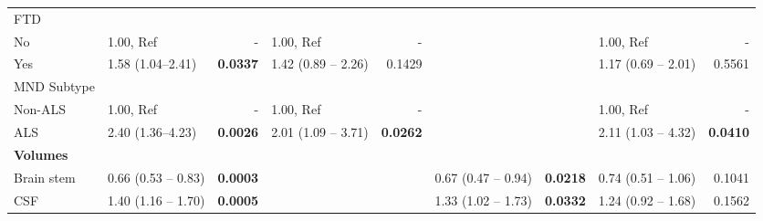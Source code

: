 \begin{sidewaystable}
{\begin{tabular}{|l|lr|lr|lr|lr|}
\hline
FTD &  &  &  &  & {\cellcolor[rgb]{0.753,0.753,0.753}} & {\cellcolor[rgb]{0.753,0.753,0.753}} &  &  \\
\hspace{5mm}No & 1.00, Ref & - & 1.00, Ref & - & {\cellcolor[rgb]{0.753,0.753,0.753}} & {\cellcolor[rgb]{0.753,0.753,0.753}} & 1.00, Ref & - \\
\hspace{5mm}Yes & 1.58 (1.04--2.41) & \textbf{0.0337} & \textcolor[rgb]{0.2,0.2,0.2}{1.42 (0.89 -- 2.26)} & \textcolor[rgb]{0.2,0.2,0.2}{0.1429} & {\cellcolor[rgb]{0.753,0.753,0.753}} & {\cellcolor[rgb]{0.753,0.753,0.753}} & \textcolor[rgb]{0.2,0.2,0.2}{1.17 (0.69 -- 2.01)} & \textcolor[rgb]{0.2,0.2,0.2}{0.5561} \\ 
\hline
MND Subtype &  &  &  &  & {\cellcolor[rgb]{0.753,0.753,0.753}} & {\cellcolor[rgb]{0.753,0.753,0.753}} &  &  \\
\hspace{5mm}Non-ALS & 1.00, Ref & - & 1.00, Ref & - & {\cellcolor[rgb]{0.753,0.753,0.753}} & {\cellcolor[rgb]{0.753,0.753,0.753}} & 1.00, Ref & - \\
\hspace{5mm}ALS & 2.40 (1.36--4.23) & \textbf{0.0026} & \textcolor[rgb]{0.2,0.2,0.2}{2.01 (1.09 -- 3.71)} & \textcolor[rgb]{0.2,0.2,0.2}{\textbf{0.0262}} & {\cellcolor[rgb]{0.753,0.753,0.753}} & {\cellcolor[rgb]{0.753,0.753,0.753}} & \textcolor[rgb]{0.2,0.2,0.2}{2.11 (1.03 -- 4.32)} & \textcolor[rgb]{0.2,0.2,0.2}{\textbf{0.0410}} \\ 
\hline
\multicolumn{1}{|l}{\textbf{Volumes}} &  & \multicolumn{1}{l}{} &  & \multicolumn{1}{l}{} &  & \multicolumn{1}{l}{} &  &  \\ 
\hline
Brain stem & \textcolor[rgb]{0.2,0.2,0.2}{0.66 (0.53 -- 0.83)} & \textcolor[rgb]{0.2,0.2,0.2}{\textbf{0.0003}} & {\cellcolor[rgb]{0.753,0.753,0.753}} & {\cellcolor[rgb]{0.753,0.753,0.753}} & \textcolor[rgb]{0.2,0.2,0.2}{0.67 (0.47 -- 0.94)} & \textcolor[rgb]{0.2,0.2,0.2}{\textbf{0.0218}} & \textcolor[rgb]{0.2,0.2,0.2}{0.74 (0.51 -- 1.06)} & \textcolor[rgb]{0.2,0.2,0.2}{0.1041} \\ 
\hline
CSF & \textcolor[rgb]{0.2,0.2,0.2}{1.40 (1.16 -- 1.70)} & \textcolor[rgb]{0.2,0.2,0.2}{\textbf{0.0005}} & {\cellcolor[rgb]{0.753,0.753,0.753}} & {\cellcolor[rgb]{0.753,0.753,0.753}} & \textcolor[rgb]{0.2,0.2,0.2}{1.33 (1.02 -- 1.73)} & \textcolor[rgb]{0.2,0.2,0.2}{\textbf{0.0332}} & \textcolor[rgb]{0.2,0.2,0.2}{1.24 (0.92 -- 1.68)} & \textcolor[rgb]{0.2,0.2,0.2}{0.1562} \\ 

\end{tabular}}
\end{sidewaystable}
